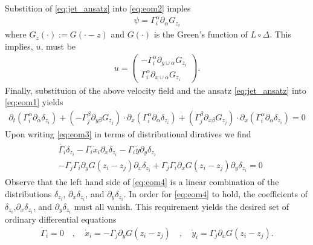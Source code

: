\documentclass[12pt]{amsart}
\begin{document}
Substition of \eqref{eq:jet_ansatz} into \eqref{eq:eom2} imples
\begin{align*}
  \psi = \Gamma^\alpha_i \partial_\alpha G_{z_i}
\end{align*}
where $G_{z}(\cdot) := G( \cdot - z)$ and  $G(\cdot)$ is the Green's function of $L \circ \Delta$.
This implies, $u$, must be
\begin{align*}
  u = \begin{pmatrix}
   - \Gamma_i^\alpha \partial_{y \cup \alpha} G_{z_i} \\
    \Gamma_i^\alpha \partial_{x \cup \alpha} G_{z_i}
  \end{pmatrix}.
\end{align*}
Finally, substituion of the above velocity field
and the ansatz \eqref{eq:jet_ansatz} into \eqref{eq:eom1} yields
\begin{align}
  \partial_t ( \Gamma^\alpha_i \partial_\alpha \delta_{z_i}) +  (- \Gamma^\beta_j \partial_{y \beta} G_{z_j}) \cdot \partial_x ( \Gamma^\alpha_i \partial_\alpha \delta_{z_i})  +
  (\Gamma_j^\beta \partial_{x \beta} G_{z_j} ) \cdot \partial_x  ( \Gamma^\alpha_i \partial_\alpha \delta_{z_i})= 0 \label{eq:eom3}
\end{align}
Upon writing \eqref{eq:eom3} in terms of distributional diratives we find
\begin{align}
  \begin{split}
  &\dot{\Gamma_i} \delta_{z_i} - \Gamma_i \dot{x}_i \partial_x \delta_{z_i}
  - \Gamma_i \dot{y} \partial_y \delta_{z_i} \\
  &- \Gamma_j \Gamma_i \partial_yG(z_i - z_j) \partial_x \delta_{z_i}  +
  \Gamma_j \Gamma_i \partial_x G(z_i-z_j) \partial_y \delta_{z_i}= 0 
  \end{split}
  \label{eq:eom4}
\end{align}
Observe that the left hand side of \eqref{eq:eom4}
is a linear combination of the distributions
$\delta_{z_i}$, $\partial_x\delta_{z_i}$, and $\partial_y \delta_{z_i}$.
In order for \eqref{eq:eom4} to hold, the coefficients of $\delta_{z_i}$,$\partial_x \delta_{z_i}$, and $\partial_y \delta_{z_i}$ must all vanish.
This requirement yields the desired set of ordinary differential equations
\begin{align*}
  \dot{\Gamma}_i = 0 \quad,\quad
  \dot{x}_i = - \Gamma_j \partial_y G(z_i - z_j) \quad,\quad
  \dot{y}_i =  \Gamma_j \partial_x G(z_i - z_j).
\end{align*}

\end{document}
